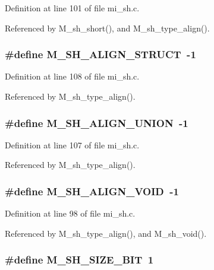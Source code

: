 Definition at line 101 of file mi\_\-sh.c.

Referenced by M\_\-sh\_\-short(), and M\_\-sh\_\-type\_\-align().
\subsubsection{\setlength{\rightskip}{0pt plus 5cm}\#define M\_\-SH\_\-ALIGN\_\-STRUCT~-1}\label{mi__sh_8c_b1b82150c9d53f7a4edd358ae55a4f54}




Definition at line 108 of file mi\_\-sh.c.

Referenced by M\_\-sh\_\-type\_\-align().
\subsubsection{\setlength{\rightskip}{0pt plus 5cm}\#define M\_\-SH\_\-ALIGN\_\-UNION~-1}\label{mi__sh_8c_4c9b2257a53d753098db2cc6d1b03f20}




Definition at line 107 of file mi\_\-sh.c.

Referenced by M\_\-sh\_\-type\_\-align().
\subsubsection{\setlength{\rightskip}{0pt plus 5cm}\#define M\_\-SH\_\-ALIGN\_\-VOID~-1}\label{mi__sh_8c_a8948a7128c00b026cac58a9000e4e9a}




Definition at line 98 of file mi\_\-sh.c.

Referenced by M\_\-sh\_\-type\_\-align(), and M\_\-sh\_\-void().
\subsubsection{\setlength{\rightskip}{0pt plus 5cm}\#define M\_\-SH\_\-SIZE\_\-BIT~1}\label{mi__sh_8c_7e4fec49315746414e841a2844b869a3}




